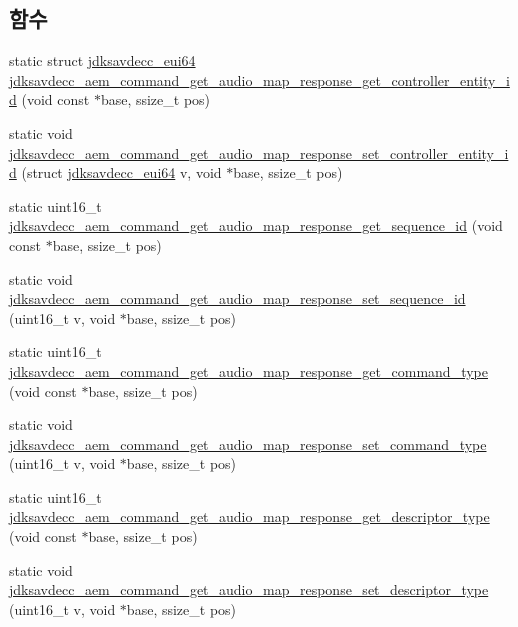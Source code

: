 \subsection*{함수}
\begin{DoxyCompactItemize}
\item 
static struct \hyperlink{structjdksavdecc__eui64}{jdksavdecc\+\_\+eui64} \hyperlink{group__command__get__audio__map__response_gab257449f0d0df6fb56fd88d9e751724f}{jdksavdecc\+\_\+aem\+\_\+command\+\_\+get\+\_\+audio\+\_\+map\+\_\+response\+\_\+get\+\_\+controller\+\_\+entity\+\_\+id} (void const $\ast$base, ssize\+\_\+t pos)
\item 
static void \hyperlink{group__command__get__audio__map__response_ga94a6ee39f57d0738527e3698535c730c}{jdksavdecc\+\_\+aem\+\_\+command\+\_\+get\+\_\+audio\+\_\+map\+\_\+response\+\_\+set\+\_\+controller\+\_\+entity\+\_\+id} (struct \hyperlink{structjdksavdecc__eui64}{jdksavdecc\+\_\+eui64} v, void $\ast$base, ssize\+\_\+t pos)
\item 
static uint16\+\_\+t \hyperlink{group__command__get__audio__map__response_ga723d91f9a531a4ab13f67545d44c48a7}{jdksavdecc\+\_\+aem\+\_\+command\+\_\+get\+\_\+audio\+\_\+map\+\_\+response\+\_\+get\+\_\+sequence\+\_\+id} (void const $\ast$base, ssize\+\_\+t pos)
\item 
static void \hyperlink{group__command__get__audio__map__response_gac25a25c3126cb4d824629b5c8b664eca}{jdksavdecc\+\_\+aem\+\_\+command\+\_\+get\+\_\+audio\+\_\+map\+\_\+response\+\_\+set\+\_\+sequence\+\_\+id} (uint16\+\_\+t v, void $\ast$base, ssize\+\_\+t pos)
\item 
static uint16\+\_\+t \hyperlink{group__command__get__audio__map__response_ga4f8217fd04947c5e6435b9d27044f027}{jdksavdecc\+\_\+aem\+\_\+command\+\_\+get\+\_\+audio\+\_\+map\+\_\+response\+\_\+get\+\_\+command\+\_\+type} (void const $\ast$base, ssize\+\_\+t pos)
\item 
static void \hyperlink{group__command__get__audio__map__response_ga851978ca2bb7184ee7294b0143e14406}{jdksavdecc\+\_\+aem\+\_\+command\+\_\+get\+\_\+audio\+\_\+map\+\_\+response\+\_\+set\+\_\+command\+\_\+type} (uint16\+\_\+t v, void $\ast$base, ssize\+\_\+t pos)
\item 
static uint16\+\_\+t \hyperlink{group__command__get__audio__map__response_gadad3ed6c46e1496f7d1b519166e81425}{jdksavdecc\+\_\+aem\+\_\+command\+\_\+get\+\_\+audio\+\_\+map\+\_\+response\+\_\+get\+\_\+descriptor\+\_\+type} (void const $\ast$base, ssize\+\_\+t pos)
\item 
static void \hyperlink{group__command__get__audio__map__response_ga58ed32b75e34dcc09d31033efcbecf0b}{jdksavdecc\+\_\+aem\+\_\+command\+\_\+get\+\_\+audio\+\_\+map\+\_\+response\+\_\+set\+\_\+descriptor\+\_\+type} (uint16\+\_\+t v, void $\ast$base, ssize\+\_\+t pos)

\end{DoxyCompactItemize}
